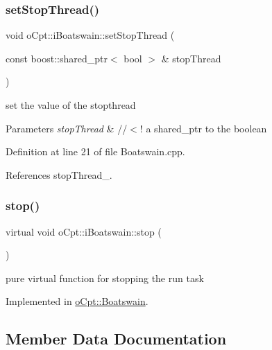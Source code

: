 \subsubsection{\texorpdfstring{set\+Stop\+Thread()}{setStopThread()}}
{\footnotesize\ttfamily void o\+Cpt\+::i\+Boatswain\+::set\+Stop\+Thread (\begin{DoxyParamCaption}\item[{const boost\+::shared\+\_\+ptr$<$ bool $>$ \&}]{stop\+Thread }\end{DoxyParamCaption})}

set the value of the stopthread 
\begin{DoxyParams}{Parameters}
{\em stop\+Thread} & //$<$! a shared\+\_\+ptr to the boolean \\
\hline
\end{DoxyParams}


Definition at line 21 of file Boatswain.\+cpp.



References stop\+Thread\+\_\+.

\hypertarget{classo_cpt_1_1i_boatswain_ad1fb6362c814a72ea6c4dc9a9042cf5e}{}\label{classo_cpt_1_1i_boatswain_ad1fb6362c814a72ea6c4dc9a9042cf5e} 
\subsubsection{\texorpdfstring{stop()}{stop()}}
{\footnotesize\ttfamily virtual void o\+Cpt\+::i\+Boatswain\+::stop (\begin{DoxyParamCaption}{ }\end{DoxyParamCaption})\hspace{0.3cm}{\ttfamily [pure virtual]}}

pure virtual function for stopping the run task 

Implemented in \hyperlink{classo_cpt_1_1_boatswain_ad538cca1d6429dacf09b22c53291074f}{o\+Cpt\+::\+Boatswain}.



\subsection{Member Data Documentation}
\hypertarget{classo_cpt_1_1i_boatswain_aafdc26c1366e4eee9cb156c5b6d705cf}{}\label{classo_cpt_1_1i_boatswain_aafdc26c1366e4eee9cb156c5b6d705cf} 
